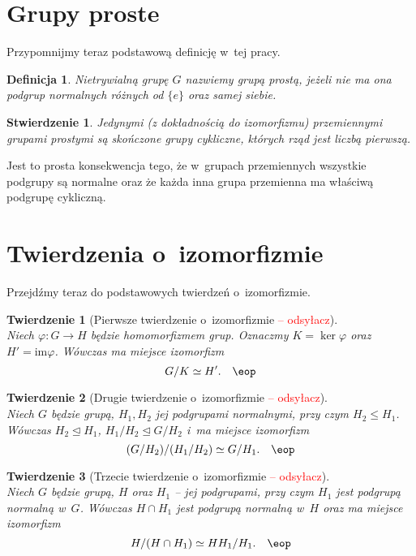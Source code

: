\documentclass[licencjacka]{pracamgr}
\newtheorem{deff}{Definicja}[section]
\newtheorem{thh}{Twierdzenie}[section]
\newtheorem{fact}{Stwierdzenie}[section]
\begin{document}
\section{Grupy proste}

Przypomnijmy teraz podstawową definicję w~tej pracy.
\begin{deff}
    Nietrywialną grupę $G$ nazwiemy \emph{grupą prostą}, jeżeli nie ma ona podgrup normalnych różnych od $\{e\}$ oraz samej siebie.
\end{deff}
\begin{fact}
    Jedynymi (z dokładnością do izomorfizmu) przemiennymi grupami prostymi są skończone grupy cykliczne,
    których rząd jest liczbą pierwszą.
\end{fact}
Jest to prosta konsekwencja tego, że w~grupach przemiennych
wszystkie podgrupy są normalne oraz że każda inna grupa przemienna ma właściwą podgrupę cykliczną.


\section{Twierdzenia o~izomorfizmie}
Przejdźmy teraz do podstawowych twierdzeń o~izomorfizmie.
\begin{thh}[Pierwsze twierdzenie o~izomorfizmie \textcolor{red}{ -- odsyłacz}] $ $ \\
    Niech $ \varphi \colon G \to H$ będzie homomorfizmem grup. Oznaczmy $K = \ker{\varphi}$ oraz
    $H' = \mathrm{im}\varphi $. 
    Wówczas ma miejsce izomorfizm $$G/K \simeq H'.\quad\eop$$
\end{thh}
\begin{thh}[Drugie twierdzenie o~izomorfizmie \textcolor{red}{ -- odsyłacz}]$ $\\
    Niech $G$ będzie grupą,  $H_1, H_2$ jej podgrupami normalnymi,
    przy czym $H_2 \leq H_1$. 
    Wówczas $H_2 \trianglelefteq H_1$, $H_1/H_2 \trianglelefteq G/H_2$ i~ma miejsce izomorfizm
    $$ (G/H_2) / (H_1/H_2) \simeq G/H_1.\quad\eop$$
\end{thh}
\begin{thh}[Trzecie twierdzenie o~izomorfizmie \textcolor{red}{ -- odsyłacz}] $ $ \\
    Niech $G$ będzie grupą, $H$ oraz $H_1$
    -- jej podgrupami, przy czym $H_1$ jest podgrupą normalną w~$G$. 
    Wówczas $H\cap H_1$ jest podgrupą normalną w~$H$ oraz ma miejsce izomorfizm
    $$ H/(H\cap H_1) \simeq HH_1 / H_1.\quad\eop$$
\end{thh}
\end{document}
